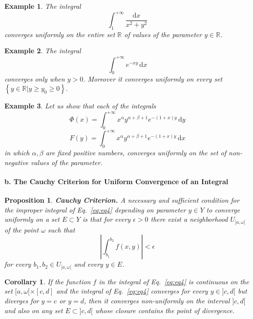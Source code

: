 \documentclass[a4paper,12pt]{article}
\newtheorem{example}{Example}             %
\newtheorem{proposition}{Proposition}
\newtheorem{corollary}{Corollary}
\begin{document}
\begin{CJK}{UTF8}{gbsn}
    \begin{example}
        The integral 
        \[
            \int_1^{+\infty} \frac{\mathrm{d}x}{x^2+y^2}
        \]
        converges uniformly on the entire set $\mathbb{R}$ of values of the 
        parameter $y \in \mathbb{R}$.
    \end{example}

    \begin{example}
        The integral 
        \[
            \int_0^{+\infty} e^{-xy}\, \mathrm{d}x
        \]
    converges only when $y > 0$. Moreover it converges uniformly on every 
        set $\left\{y \in \mathbb{R} \vert y \ge y_0 \ge 0 \right\}.$
    \end{example}

    \begin{example}
        Let us show that each of the integrals 
        \[
            \Phi(x) = \int_0^{+\infty} x^{\alpha}y^{\alpha+\beta+1}e^{-(1+x)y}\,\mathrm{d}y
        \]
        \[
            F(y) = \int_0^{+\infty} x^{\alpha}y^{\alpha+\beta+1}e^{-(1+x)y}\,\mathrm{d}x
        \]
    in which $\alpha,\beta$ are fixed positive numbers, converges uniformly on the set 
    of non-negative values of the parameter.
    \end{example}

    \paragraph{b. The Cauchy Criterion for Uniform Convergence of an Integral}
    \begin{proposition}{\textbf{Cauchy Criterion.}}
        A necessary and sufficient condition for the improper integral of 
        Eq.~\ref{eq:eq4} depending on parameter $y \in Y$ to converge uniformly 
        on a set $E \subset Y$ is that for every $\epsilon > 0$ there exist a neighborhood 
        $U_{[a,\omega[}$ of the point $\omega$ such that 
        \[
           \left| \int_{b_1}^{b_2}f(x,y)\right| < \epsilon
        \]
    for every $b_1,b_2 \in U_{[a,\omega[}$ and every $y \in E$.
    \end{proposition}

    \begin{corollary}
        If the function $f$ in the integral of Eq.~\ref{eq:eq4} is continuous 
        on the set $[a, \omega[ \times [c, d]$ and the integral of Eq.~\ref{eq:eq4} 
        converges for every $y \in ]c,d[$ but diverges for $y = c$ or $y = d$,
        then it converges non-uniformly on the interval $]c,d[$ and also on 
        any set $E \subset ]c,d[$ whose closure contains the point of divergence.
    \end{corollary}


\end{CJK}
\end{document}
